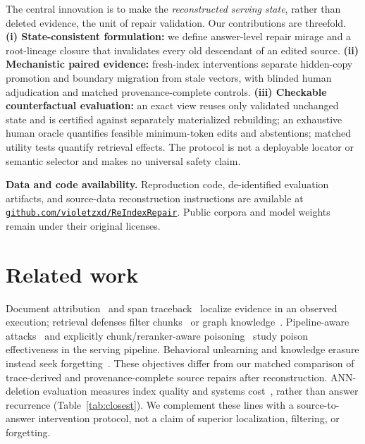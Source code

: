\documentclass{article}
\begin{document}
The central innovation is to make the \emph{reconstructed serving state},
rather than deleted evidence, the unit of repair validation. Our contributions
are threefold. \textbf{(i) State-consistent formulation:} we define answer-level
repair mirage and a root-lineage closure that invalidates every old descendant
of an edited source. \textbf{(ii) Mechanistic paired evidence:} fresh-index
interventions separate hidden-copy promotion and boundary migration from stale
vectors, with blinded human adjudication and matched provenance-complete
controls. \textbf{(iii) Checkable counterfactual evaluation:} an exact view
reuses only validated unchanged state and is certified against separately
materialized rebuilding; an exhaustive human oracle quantifies feasible
minimum-token edits and abstentions; matched utility tests quantify retrieval
effects. The protocol is not a deployable locator or semantic selector and
makes no universal safety claim.

\textbf{Data and code availability.} Reproduction code, de-identified evaluation
artifacts, and source-data reconstruction instructions are available at
\href{https://github.com/violetzxd/ReIndexRepair}{\texttt{github.com/violetzxd/ReIndexRepair}}.
Public corpora and model weights remain under their original licenses.

\section{Related work}
Document attribution~\cite{zhang2025ragforensics,zhang2025ragorigin} and
span traceback~\cite{cui2026needle} localize evidence in an observed execution;
retrieval defenses filter chunks~\cite{moradi2026cegrag,pathmanathan2025ragmask}
or graph knowledge~\cite{noughabi2026hog}. Pipeline-aware attacks~\cite{chang2025authchain}
and explicitly chunk/reranker-aware poisoning~\cite{nie2026crcp} study poison
effectiveness in the serving pipeline. Behavioral unlearning and knowledge erasure instead seek
forgetting~\cite{wang2026ragunlearning,wang2026eraser4rag}. These objectives
differ from our matched comparison of trace-derived and provenance-complete
source repairs after reconstruction. ANN-deletion evaluation measures index
quality and systems cost~\cite{yamashita2025deletion}, rather than answer
recurrence (Table~\ref{tab:closest}). We complement these lines with a
source-to-answer intervention protocol, not a claim of superior localization,
filtering, or forgetting.
\end{document}
